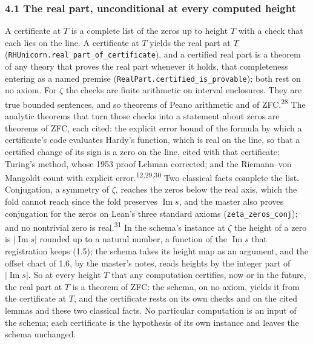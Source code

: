 \documentclass[10pt]{article}
\begin{document}
\hypertarget{the-real-part-unconditional-at-every-computed-height}{%
\subsubsection{4.1 The real part, unconditional at every computed
height}\label{the-real-part-unconditional-at-every-computed-height}}

A certificate at \(T\) is a complete list of the zeros up to height
\(T\) with a check that each lies on the line. A certificate at \(T\)
yields the real part at \(T\)
(\texttt{RHUnicorn.\allowbreak{}real\_\allowbreak{}part\_\allowbreak{}of\_\allowbreak{}certificate}),
and a certified real part is a theorem of any theory that proves the
real part whenever it holds, that completeness entering as a named
premise
(\texttt{RealPart.\allowbreak{}certified\_\allowbreak{}is\_\allowbreak{}provable});
both rest on no axiom. For \(\zeta\) the checks are finite arithmetic on
interval enclosures. They are true bounded sentences, and so theorems of
Peano arithmetic and of ZFC.\textsuperscript{28} The analytic theorems
that turn those checks into a statement about zeros are theorems of ZFC,
each cited: the explicit error bound of the formula by which a
certificate's code evaluates Hardy's function, which is real on the
line, so that a certified change of its sign is a zero on the line,
cited with that certificate; Turing's method, whose 1953 proof Lehman
corrected; and the Riemann--von Mangoldt count with explicit
error.\textsuperscript{12,29,30} Two classical facts complete the list.
Conjugation, a symmetry of \(\zeta\), reaches the zeros below the real
axis, which the fold cannot reach since the fold preserves
\(\operatorname{Im} s\), and the master also proves conjugation for the
zeros on Lean's three standard axioms
(\texttt{zeta\_\allowbreak{}zeros\_\allowbreak{}conj}); and no
nontrivial zero is real.\textsuperscript{31} In the schema's instance at
\(\zeta\) the height of a zero is \(|\operatorname{Im} s|\) rounded up
to a natural number, a function of the \(\operatorname{Im} s\) that
registration keeps (1.5); the schema takes its height map as an
argument, and the offset chart of 1.6, by the master's notes, reads
heights by the integer part of \(|\operatorname{Im} s|\). So at every
height \(T\) that any computation certifies, now or in the future, the
real part at \(T\) is a theorem of ZFC: the schema, on no axiom, yields
it from the certificate at \(T\), and the certificate rests on its own
checks and on the cited lemmas and these two classical facts. No
particular computation is an input of the schema; each certificate is
the hypothesis of its own instance and leaves the schema unchanged.
\end{document}

